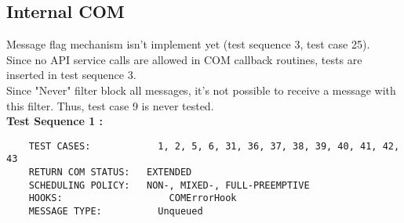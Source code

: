 \documentclass[10pt]{article}
\newlength{\Li}\settowidth{\Li}{Running}
\newlength{\Lii}\setlength{\Lii}{7cm}
\newlength{\Liiii}\setlength{\Liiii}{0.9cm}
\newlength{\Liii}\setlength{\Liii}{\textwidth} \addtolength{\Liii}{-\Li} \addtolength{\Liii}{-\Lii} \addtolength{\Liii}{-\Liiii}
\begin{document}
%	



\subsection{Internal COM}
	Message flag mechanism isn't implement yet (test sequence 3, test case 25).\\
	Since no API service calls are allowed in COM callback routines, tests are inserted in test sequence 3.\\
	Since "Never" filter block all messages, it's not possible to receive a message with this filter. Thus, test case 9 is never tested.\\
	
\setlength{\Lii}{6.5cm}	
\setlength{\Liii}{\textwidth} \addtolength{\Liii}{-\Li} \addtolength{\Liii}{-\Lii} \addtolength{\Liii}{-\Liiii}
	\textbf{Test Sequence 1 :}
	\begin{lstlisting}
	TEST CASES:		       1, 2, 5, 6, 31, 36, 37, 38, 39, 40, 41, 42, 43
	RETURN COM STATUS:	 EXTENDED
	SCHEDULING POLICY:   NON-, MIXED-, FULL-PREEMPTIVE
	HOOKS:			         COMErrorHook
	MESSAGE TYPE:	       Unqueued
	\end{lstlisting}
	
	
\end{document}
